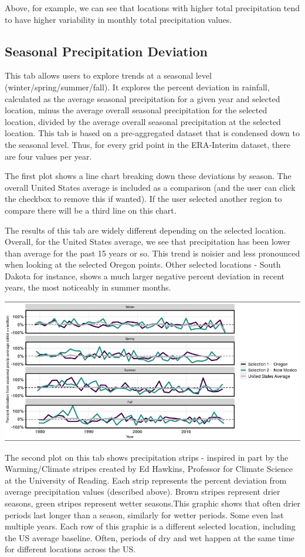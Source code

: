 \documentclass[10pt,letterpaper]{article}
\begin{document}
Above, for example, we can see that locations with higher total precipitation tend to have higher variability in monthly total precipitation values.

\subsection*{Seasonal Precipitation Deviation}

This tab allows users to explore trends at a seasonal level (winter/spring/summer/fall).  It explores the percent deviation in rainfall, calculated as the average seasonal precipitation for a given year and selected location, minus the average overall seasonal precipitation for the selected location, divided by the average overall seasonal precipitation at the selected location.  This tab is based on a pre-aggregated dataset that is condensed down to the seasonal level. Thus, for every grid point in the ERA-Interim dataset, there are four values per year.

The first plot shows a line chart breaking down these deviations by season. The overall United States average is included as a comparison (and the user can click the checkbox to remove this if wanted). If the user selected another region to compare there will be a third line on this chart.


The results of this tab are widely different depending on the selected location. Overall, for the United States average, we see that precipitation has been lower than average for the past 15 years or so. This trend is noisier and less pronounced when looking at the selected Oregon points. Other selected locations - South Dakota for instance, shows a much larger negative percent deviation in recent years, the most noticeably in summer months.

\begin{center}
  \includegraphics[width = .8\textwidth]{graphics/seasonal_deviation}
\end{center}

The second plot on this tab shows precipitation strips - inspired in part by the Warming/Climate stripes created by Ed Hawkins, Professor for Climate Science at the University of Reading\cite{hawkins}. Each strip represents the percent deviation from average precipitation values (described above). Brown stripes represent drier seasons, green stripes represent wetter seasons.This graphic shows that often drier periods last longer than a season, similarly for wetter periods. Some even last multiple years. Each row of this graphic is a different selected location, including the US average baseline. Often, periods of dry and wet happen at the same time for different locations across the US.
\end{document}
